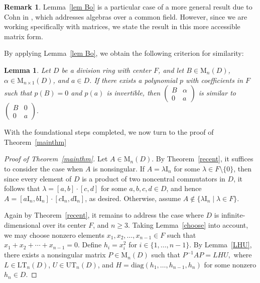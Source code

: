 \documentclass[11pt]{article}
\newtheorem{lemma}[theorem]{Lemma}
\theoremstyle{definition}
\newtheorem{remark}[theorem]{Remark}%
\begin{document}
{{{{				\begin{remark}
					Lemma~\ref{lem Bo} is a particular case of a more general result due to Cohn in \cite[Lemma 2.3]{Pa_Co_73}, which addresses algebras over a common field. However, since we are working specifically with matrices, we state the result in this more accessible matrix form.
				\end{remark}
				
				By applying Lemma~\ref{lem Bo}, we obtain the following criterion for similarity:
				
				\begin{lemma}\label{cheo khoi}
					Let $D$ be a division ring with center $F$, and let \( B \in \mathrm{M}_n(D) \), \( \alpha \in \mathrm{M}_{n \times 1}(D) \), and \( a \in D \). If there exists a polynomial \( p \) with coefficients in $F$ such that \( p(B) = 0 \) and \( p(a) \) is invertible, then $\begin{pmatrix}
						B & \alpha \\
						0 & a
					\end{pmatrix}$ is similar to
					$\begin{pmatrix}
						B & 0 \\
						0 & a
					\end{pmatrix}.$
				\end{lemma}
				
				With the foundational steps completed, we now turn to the proof of Theorem~\ref{mainthm}
				
				\begin{proof}[Proof of Theorem~\ref{mainthm}]
					Let $A \in \mathrm{M}_n(D)$. By Theorem~\ref{recent}, it suffices to consider the case when $A$ is nonsingular. If $A = \lambda \mathrm{I}_n$ for some $\lambda \in F\setminus\{0\}$, then since every element of $D$ is a product of two noncentral commutators in $D$, it follows that $\lambda = [a,b]\cdot [c,d]$ for some $a,b,c,d \in D$, and hence $A = [a \mathrm{I}_n, b \mathrm{I}_n]\cdot[c \mathrm{I}_n, d \mathrm{I}_n]$, as desired. Otherwise, assume $A \notin \{ \lambda \mathrm{I}_n \mid \lambda \in F \}$.
					
					Again by Theorem~\ref{recent}, it remains to address the case where $D$ is infinite-dimensional over its center $F$, and $n \geq 3$. Taking Lemma~\ref{choose} into account, we may choose nonzero elements $x_1, x_2, \dots, x_{n-1} \in F$ such that $x_1 + x_2 + \cdots + x_{n-1} = 0$. Define $h_i = x_i^2$ for $i \in \{1, \dots, n-1\}$. By Lemma~\ref{LHU}, there exists a nonsingular matrix $P \in \mathrm{M}_n(D)$ such that
					$
					P^{-1} A P = LHU,
					$ where $L \in \mathrm{LT}_n(D)$, $U \in \mathrm{UT}_n(D)$, and $H = \mathrm{diag}(h_1, \dots, h_{n-1}, h_n)$ for some nonzero $h_n \in D$.
					

\end{proof}}}}}
\end{document}
